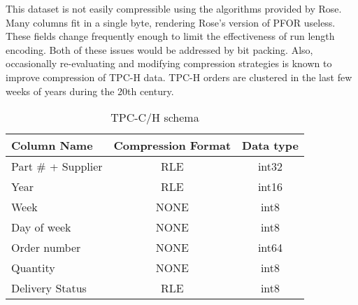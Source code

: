 \documentclass{vldb}
\newcommand{\rows}{Rose\xspace}
\newcommand{\rowss}{Rose's\xspace}
\newcommand{\xxx}[1]{\textcolor{red}{\bf XXX: #1}}
\renewcommand{\xxx}[1]{\xspace}
\begin{document}
This dataset is not easily compressible using the algorithms provided
by \rows.  Many columns fit in a single byte, rendering \rowss version
of PFOR useless.  These fields change frequently enough to limit the
effectiveness of run length encoding.  Both of these issues would be
addressed by bit packing.  Also, occasionally re-evaluating and modifying
compression strategies is known to improve compression of TPC-H data.
TPC-H orders are clustered in the last few weeks of years during the
20th century.\xxx{check}

\begin{table}
\caption{TPC-C/H schema}
\centering
\label{tab:tpc-schema}
\begin{tabular}{|l|c|c|} \hline
Column Name     & Compression Format &  Data type\\ \hline
Part \# + Supplier & RLE       & int32              \\ \hline
Year            & RLE       & int16              \\\hline
Week            & NONE      & int8               \\\hline
Day of week     & NONE      & int8               \\\hline
Order number    & NONE      & int64              \\\hline
Quantity        & NONE      & int8               \\\hline
Delivery Status & RLE       & int8               \\\hline
\end{tabular}
\end{table}


\end{document}
